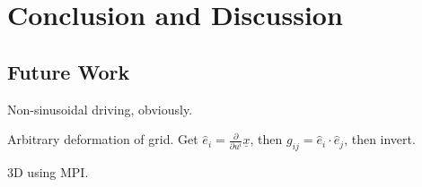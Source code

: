 
\chapter{Conclusion and Discussion}
\label{ch_conclusion}



\section{Future Work}

Non-sinusoidal driving, obviously. 

Arbitrary deformation of grid. Get $\hat{e}_i = \frac{\partial}{\partial u^i} \underline{x}$, then $g_{ij} = \hat{e}_i \cdot \hat{e}_j$, then invert. 

3D using MPI. 
